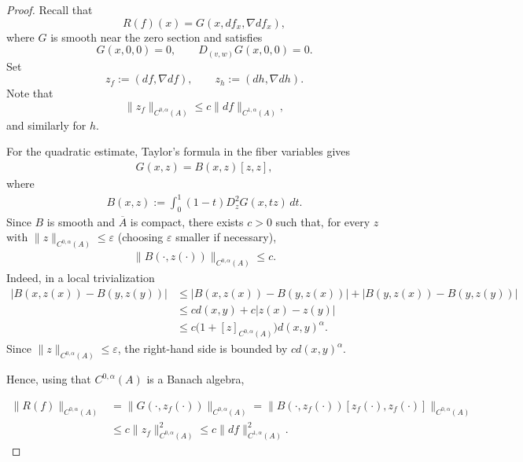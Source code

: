 \documentclass[11pt]{amsart}
\theoremstyle{definition}
\theoremstyle{remark}
\begin{document}
\begin{proof}
Recall that
\[
    R(f)(x)=G(x,df_x,\nabla df_x),
\]
where \(G\) is smooth near the zero section and satisfies
\[
    G(x,0,0)=0,
    \qquad
    D_{(v,w)}G(x,0,0)=0.
\]
Set
\[
    z_f:=(df,\nabla df),
    \qquad
    z_h:=(dh,\nabla dh).
\]
Note that
\[
    \|z_f\|_{C^{0,\alpha}(A)}
    \le
    c\|df\|_{C^{1,\alpha}(A)},
\]
and similarly for \(h\).

For the quadratic estimate, Taylor's formula in the fiber variables gives
\begin{align}\label{eq: def-B-bilinear}
    G(x,z)=B(x,z)[z,z],
\end{align}
where
\begin{align}\label{eq: B-as-integral}
    B(x,z)
    :=
    \int_0^1(1-t)D_z^2G(x,tz)\,dt .
\end{align}
Since \(B\) is smooth and \(\overline A\) is compact, there exists \(c>0\) such that, for every
\(z\) with \(\|z\|_{C^{0,\alpha}(A)}\le \varepsilon\) (choosing $\varepsilon$ smaller if necessary),
\begin{align*}
    \|B(\cdot,z(\cdot))\|_{C^{0,\alpha}(A)}
    \le c.
\end{align*}
Indeed, in a local trivialization
\[
\begin{aligned}
|B(x,z(x))-B(y,z(y))|
&\le
|B(x,z(x))-B(y,z(x))| +
|B(y,z(x))-B(y,z(y))| \\
&\le
c d(x,y)+c|z(x)-z(y)| \\
&\le
c\bigl(1+[z]_{C^{0,\alpha}(A)}\bigr)d(x,y)^\alpha.
\end{aligned}
\]
Since \(\|z\|_{C^{0,\alpha}(A)}\le\varepsilon\), the right-hand side is bounded
by \(c d(x,y)^\alpha\).


Hence, using that
\(C^{0,\alpha}(A)\) is a Banach algebra,

\begin{align}\label{eq: Holder-estimate-Rf}
    \|R(f)\|_{C^{0,\alpha}(A)}
    &=
    \|G(\cdot,z_f(\cdot))\|_{C^{0,\alpha}(A)} =
    \|B(\cdot,z_f(\cdot))[z_f(\cdot),z_f(\cdot)]\|_{C^{0,\alpha}(A)} \\
    \nonumber
    &\le
    c\|z_f\|_{C^{0,\alpha}(A)}^2 \le
    c\|df\|_{C^{1,\alpha}(A)}^2.
\end{align}



\end{proof}
\end{document}
